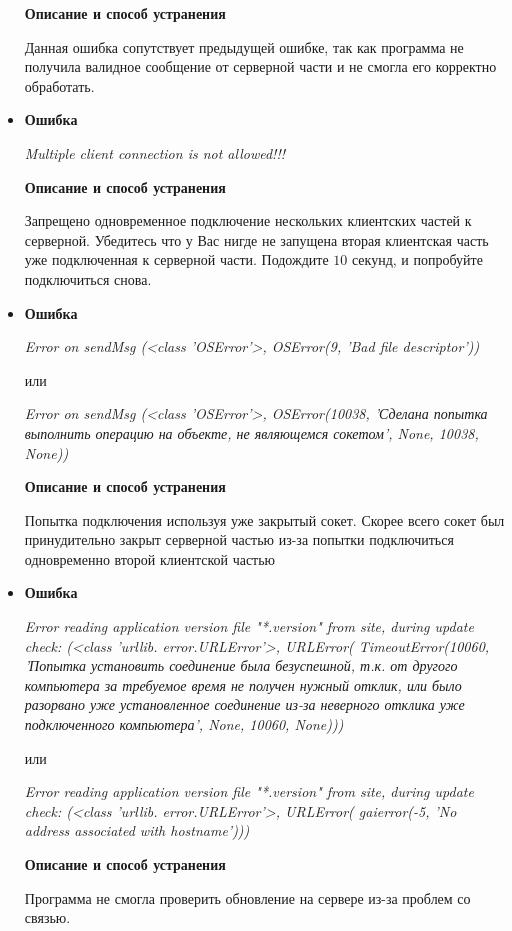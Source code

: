 \begin{itemize}
\textbf{Описание и способ устранения}

Данная ошибка сопутствует предыдущей ошибке, так как программа не получила валидное сообщение от серверной части и не смогла его корректно обработать.

\item \textbf{Ошибка}

\textit{Multiple client connection is not allowed!!!}

\textbf{Описание и способ устранения}

Запрещено одновременное подключение нескольких клиентских частей к серверной. Убедитесь что у Вас нигде не запущена вторая клиентская часть уже подключенная к серверной части.
Подождите $10$ секунд, и попробуйте подключиться снова.

\item \textbf{Ошибка}

\textit{Error on sendMsg (<class 'OSError'>, OSError(9, 'Bad file descriptor'))}

или

\textit{Error on sendMsg (<class 'OSError'>, OSError(10038, 'Сделана попытка выполнить операцию на объекте, не являющемся сокетом', None, 10038, None))}

\textbf{Описание и способ устранения}

Попытка подключения используя уже закрытый сокет. Скорее всего сокет был принудительно закрыт серверной частью из-за попытки подключиться одновременно второй клиентской частью

\item \textbf{Ошибка}

\textit{Error reading application version file "*.version" from site, during update check: (<class 'urllib. error.URLError'>, URLError( TimeoutError(10060, 'Попытка
установить соединение была безуспешной, т.к. от другого компьютера за требуемое время не получен нужный отклик, или было разорвано уже установленное соединение из-за неверного отклика уже
подключенного компьютера', None, 10060, None)))}

или

\textit{Error reading application version file "*.version" from site, during update check: (<class 'urllib. error.URLError'>, URLError( gaierror(-5, 'No address associated with hostname')))}

\textbf{Описание и способ устранения}

Программа не смогла проверить обновление на сервере из-за проблем со связью.

\end{itemize}

